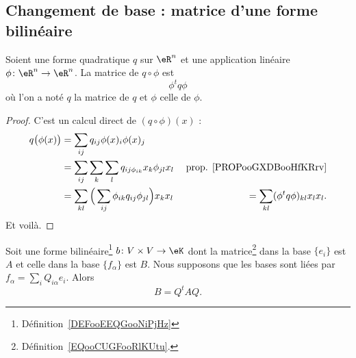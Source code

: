 \subsection{Changement de base : matrice d'une forme bilinéaire}

\begin{proposition}		\label{PROPooOKTGooOYukoB}
	Soient une forme quadratique \( q\) sur \( \eR^n\) et une application linéaire \(\phi \colon \eR^n\to \eR^n  \). La matrice de \( q\circ \phi\) est
	\begin{equation}
		\phi^tq\phi
	\end{equation}
	où l'on a noté \( q\) la matrice de \( q\) et \( \phi\) celle de \( \phi\).
\end{proposition}

\begin{proof}
	C'est un calcul direct de \( (q\circ\phi)(x)\) :
	\begin{subequations}
		\begin{align}
			q\big( \phi(x) \big) & =\sum_{ij}q_{ij}\phi(x)_i\phi(x)_j                                                                       \\
			                     & = \sum_{ij}\sum_k\sum_lq_{ij\phi_{ik}}x_k\phi_{jl}x_l            & \text{prop. \ref{PROPooGXDBooHfKRrv}} \\
			                     & = \sum_{kl}\Big( \sum_{ij}\phi_{ik}q_{ij}\phi_{jl} \Big)x_kx_l\
			                     & = \sum_{kl} (\phi^tq\phi)_{kl}x_lx_l.
		\end{align}
	\end{subequations}
	Et voilà.
\end{proof}


\begin{proposition}     \label{PROPooLBIOooUpzxXA}
	Soit une forme bilinéaire\footnote{Définition~\ref{DEFooEEQGooNiPjHz}} \( b\colon V\times V\to \eK\) dont la matrice\footnote{Définition~\ref{EQooCUGFooRlKUtu}.} dans la base \( \{ e_i \}\) est \( A\) et celle dans la base \( \{ f_{\alpha} \}\) est \( B\). Nous supposons que les bases sont liées par \( f_{\alpha}=\sum_{i}Q_{i\alpha}e_i\). Alors
	\begin{equation}        \label{EQooZUVTooKjqnJj}
		B=Q^tAQ.
	\end{equation}
\end{proposition}

